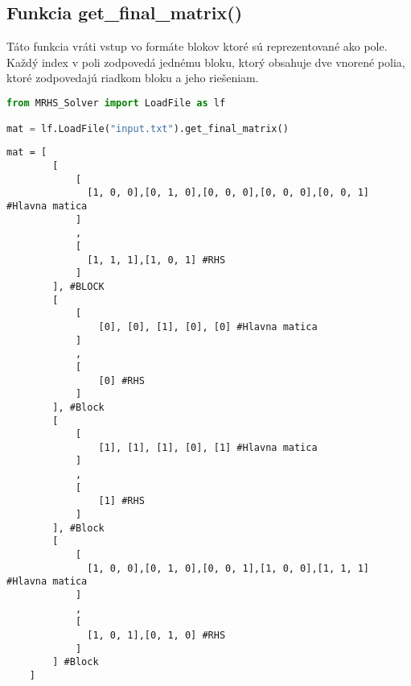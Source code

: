 \subsection{Funkcia get\_final\_matrix()}
Táto funkcia vráti vstup vo formáte blokov ktoré sú reprezentované ako pole. Každý index v poli zodpovedá jednému bloku, ktorý obsahuje dve vnorené polia, ktoré zodpovedajú riadkom bloku a jeho riešeniam. \newline
\lstset{style=mystyle}
\begin{lstlisting}[language=Python, caption=Príklad volania funkcie get\_final\_matrix()]
from MRHS_Solver import LoadFile as lf

mat = lf.LoadFile("input.txt").get_final_matrix()
\end{lstlisting}
\begin{lstlisting}[caption=Príklad výstupu funckie get\_final\_matrix() pre vstupný súbor Listing~\ref{lst:subor}.]
mat = [
        [
            [
              [1, 0, 0],[0, 1, 0],[0, 0, 0],[0, 0, 0],[0, 0, 1] #Hlavna matica
            ]
            ,
            [
              [1, 1, 1],[1, 0, 1] #RHS
            ]
        ], #BLOCK
        [
            [
                [0], [0], [1], [0], [0] #Hlavna matica
            ]
            ,
            [
                [0] #RHS
            ]
        ], #Block
        [
            [
                [1], [1], [1], [0], [1] #Hlavna matica
            ]
            ,
            [
                [1] #RHS
            ]
        ], #Block
        [
            [
              [1, 0, 0],[0, 1, 0],[0, 0, 1],[1, 0, 0],[1, 1, 1] #Hlavna matica
            ]
            ,
            [
              [1, 0, 1],[0, 1, 0] #RHS
            ]
        ] #Block
    ]
\end{lstlisting}
